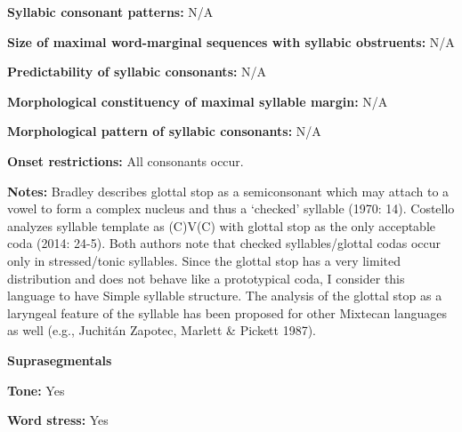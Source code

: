 \begin{styleBody}
\textbf{Syllabic consonant patterns:} N/A
\end{styleBody}

\begin{styleBody}
\textbf{Size of maximal word{}-marginal sequences with syllabic obstruents:} N/A
\end{styleBody}

\begin{styleBody}
\textbf{Predictability of syllabic consonants:} N/A
\end{styleBody}

\begin{styleBody}
\textbf{Morphological constituency of maximal syllable margin:} N/A
\end{styleBody}

\begin{styleBody}
\textbf{Morphological pattern of syllabic consonants:} N/A
\end{styleBody}

\begin{styleBody}
\textbf{Onset restrictions: }All consonants occur.
\end{styleBody}

\begin{styleBody}
\textbf{Notes: }Bradley describes glottal stop as a semiconsonant which may attach to a vowel to form a complex nucleus and thus a ‘checked’ syllable (1970: 14). Costello analyzes syllable template as (C)V(C) with glottal stop as the only acceptable coda (2014: 24-5). Both authors note that checked syllables/glottal codas occur only in stressed/tonic syllables. Since the glottal stop has a very limited distribution and does not behave like a prototypical coda, I consider this language to have Simple syllable structure. The analysis of the glottal stop as a laryngeal feature of the syllable has been proposed for other Mixtecan languages as well (e.g., Juchitán Zapotec, Marlett \& Pickett 1987).
\end{styleBody}

\begin{styleBody}
\textbf{Suprasegmentals}
\end{styleBody}

\begin{styleBody}
\textbf{Tone:} Yes
\end{styleBody}

\begin{styleBody}
\textbf{Word stress:} Yes
\end{styleBody}

